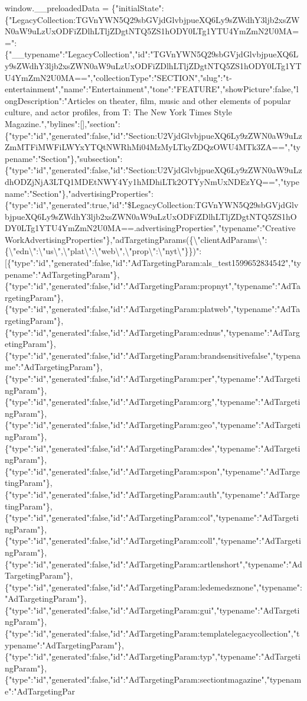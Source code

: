 window.\_\_preloadedData =
\{"initialState":\{"LegacyCollection:TGVnYWN5Q29sbGVjdGlvbjpueXQ6Ly9sZWdhY3ljb2xsZWN0aW9uLzUxODFiZDlhLTljZDgtNTQ5ZS1hODY0LTg1YTU4YmZmN2U0MA==":\{"\_\_typename":"LegacyCollection","id":"TGVnYWN5Q29sbGVjdGlvbjpueXQ6Ly9sZWdhY3ljb2xsZWN0aW9uLzUxODFiZDlhLTljZDgtNTQ5ZS1hODY0LTg1YTU4YmZmN2U0MA==","collectionType":"SECTION","slug":"t-entertainment","name":"Entertainment","tone":"FEATURE","showPicture":false,"longDescription":"Articles
on theater, film, music and other elements of popular culture, and actor
profiles, from T: The New York Times Style
Magazine.","bylines":{[}{]},"section":\{"type":"id","generated":false,"id":"Section:U2VjdGlvbjpueXQ6Ly9zZWN0aW9uLzZmMTFiMWFiLWYxYTQtNWRhMi04MzMyLTkyZDQzOWU4MTk3ZA==","typename":"Section"\},"subsection":\{"type":"id","generated":false,"id":"Section:U2VjdGlvbjpueXQ6Ly9zZWN0aW9uLzdhODZjNjA3LTQ1MDEtNWY4Yy1hMDhiLTk2OTYyNmUxNDEzYQ==","typename":"Section"\},"advertisingProperties":\{"type":"id","generated":true,"id":"\$LegacyCollection:TGVnYWN5Q29sbGVjdGlvbjpueXQ6Ly9sZWdhY3ljb2xsZWN0aW9uLzUxODFiZDlhLTljZDgtNTQ5ZS1hODY0LTg1YTU4YmZmN2U0MA==.advertisingProperties","typename":"CreativeWorkAdvertisingProperties"\},"adTargetingParams(\{\textbackslash{}"clientAdParams\textbackslash{}":\{\textbackslash{}"edn\textbackslash{}":\textbackslash{}"us\textbackslash{}",\textbackslash{}"plat\textbackslash{}":\textbackslash{}"web\textbackslash{}",\textbackslash{}"prop\textbackslash{}":\textbackslash{}"nyt\textbackslash{}"\}\})":{[}\{"type":"id","generated":false,"id":"AdTargetingParam:als\_test1599652834542","typename":"AdTargetingParam"\},\{"type":"id","generated":false,"id":"AdTargetingParam:propnyt","typename":"AdTargetingParam"\},\{"type":"id","generated":false,"id":"AdTargetingParam:platweb","typename":"AdTargetingParam"\},\{"type":"id","generated":false,"id":"AdTargetingParam:ednus","typename":"AdTargetingParam"\},\{"type":"id","generated":false,"id":"AdTargetingParam:brandsensitivefalse","typename":"AdTargetingParam"\},\{"type":"id","generated":false,"id":"AdTargetingParam:per","typename":"AdTargetingParam"\},\{"type":"id","generated":false,"id":"AdTargetingParam:org","typename":"AdTargetingParam"\},\{"type":"id","generated":false,"id":"AdTargetingParam:geo","typename":"AdTargetingParam"\},\{"type":"id","generated":false,"id":"AdTargetingParam:des","typename":"AdTargetingParam"\},\{"type":"id","generated":false,"id":"AdTargetingParam:spon","typename":"AdTargetingParam"\},\{"type":"id","generated":false,"id":"AdTargetingParam:auth","typename":"AdTargetingParam"\},\{"type":"id","generated":false,"id":"AdTargetingParam:col","typename":"AdTargetingParam"\},\{"type":"id","generated":false,"id":"AdTargetingParam:coll","typename":"AdTargetingParam"\},\{"type":"id","generated":false,"id":"AdTargetingParam:artlenshort","typename":"AdTargetingParam"\},\{"type":"id","generated":false,"id":"AdTargetingParam:ledemedsznone","typename":"AdTargetingParam"\},\{"type":"id","generated":false,"id":"AdTargetingParam:gui","typename":"AdTargetingParam"\},\{"type":"id","generated":false,"id":"AdTargetingParam:templatelegacycollection","typename":"AdTargetingParam"\},\{"type":"id","generated":false,"id":"AdTargetingParam:typ","typename":"AdTargetingParam"\},\{"type":"id","generated":false,"id":"AdTargetingParam:sectiontmagazine","typename":"AdTargetingPar